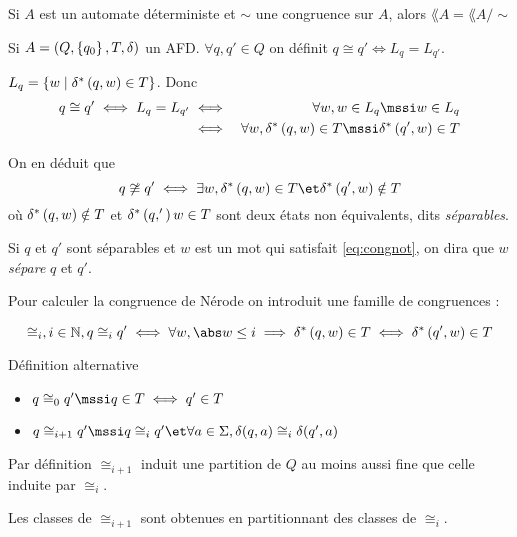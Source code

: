 \begin{prop}
	Si $A$ est un automate déterministe et $\sim$ une congruence sur $A$, alors $\lang A = \lang {A/\sim}$
\end{prop}


\begin{definition}

	Si $A = (Q, \left\{q_0\right\}, T, \delta)$ un AFD. $\forall q, q' \in Q$ on définit $q \cong q' \iff L_q = L_{q'}$.
\end{definition}

\begin{rappel}
	$L_q = \left\{w \mid \delta^{*} \left(q,w\right) \in T\right\}$.
	Donc
	\begin{eqnarray*}
		q \cong q' \iff L_q = L_{q'} &\iff& \forall w, w \in L_q \mssi w \in L_q \\
		&\iff& \forall w, \deltaS q w \in T \mssi  \deltaS {q'} w \in T
	\end{eqnarray*}

	On en déduit que
	\begin{equation}\label{eq:congnot}
		q \not\cong q' \iff \exists w, \deltaS q w \in T \et \deltaS {q'} w \notin T
	\end{equation}
	où $\delta^{*} \left(q,w\right) \notin T$ et $\delta^{*} \left(q,'\right) w \in T$ sont deux états non équivalents, dits \emph{séparables}.
\end{rappel}

Si $q$ et $q'$ sont séparables et $w$ est un mot qui satisfait \ref{eq:congnot}, on dira que $w$ \emph{sépare} $q$ et $q'$.


Pour calculer la congruence de Nérode on introduit une famille de congruences :

\begin{equation}
	\cong_i, i  \in \N, q \cong_i q' \iff \forall w, \abs w \leq i \implies \deltaS q w \in T \iff  \deltaS {q'} w \in T
\end{equation}


\begin{definition}
	Définition alternative

	\begin{itemize}
		\item $q \cong_0 q' \mssi q\in T \iff q' \in T$
		\item $q \cong_{i+1} q' \mssi q \cong_{i} q' \et  \forall a \in \alphabet, \delta (q,a) \cong_i \delta (q', a)$
	\end{itemize}
\end{definition}

\begin{remarque}
	Par définition $\cong_{i+1}$ induit une partition de $Q$ au moins aussi fine que celle induite par $\cong_i$.

	Les classes de $\cong_{i+1}$ sont obtenues en partitionnant des classes de $\cong_i$.
\end{remarque}


